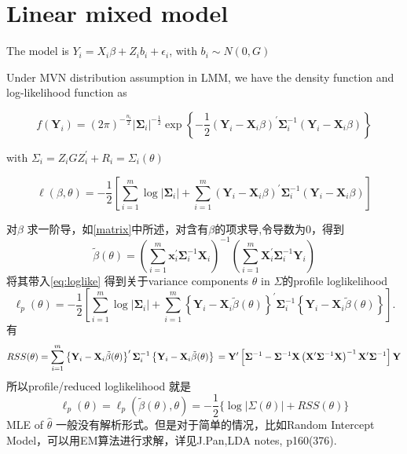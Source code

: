 \documentclass[
]{book}
\theoremstyle{definition}
\theoremstyle{definition}
\theoremstyle{definition}
\theoremstyle{remark}
\begin{document}
\hypertarget{linear-mixed-model}{%
\section{Linear mixed model}\label{linear-mixed-model}}

The model is \(Y_i=X_i\beta+Z_ib_i+\epsilon_i\), with \(b_i\sim N(0,G)\)

Under MVN distribution assumption in LMM, we have the density function and log-likelihood function as

\begin{equation}
f\left(\mathbf{Y}_{i}\right)=(2 \pi)^{-\frac{n_{i}}{2}}\left|\mathbf{\Sigma}_{i}\right|^{-\frac{1}{2}} \exp \left\{-\frac{1}{2}\left(\mathbf{Y}_{i}-\mathbf{X}_{i} \beta\right)^{\prime} \mathbf{\Sigma}_{i}^{-1}\left(\mathbf{Y}_{i}-\mathbf{X}_{i} \beta\right)\right\} 
 \label{eq:Normden}
\end{equation}

with \(\Sigma_{i}=Z_{i} G Z_{i}^{\prime}+R_{i}=\Sigma_{i}(\theta)\)

\begin{equation}
\ell(\beta, \theta)=-\frac{1}{2}\left[\sum_{i=1}^{m} \log \left|\mathbf{\Sigma}_{i}\right|+\sum_{i=1}^{m}\left(\mathbf{Y}_{i}-\mathbf{X}_{i} \beta\right)^{\prime} \mathbf{\Sigma}_{i}^{-1}\left(\mathbf{Y}_{i}-\mathbf{X}_{i} \beta\right)\right]
\label{eq:loglike}
\end{equation}

对\(\beta\) 求一阶导，如\ref{matrix}中所述，对含有\(\beta\)的项求导,令导数为0，得到
\[
\tilde{\beta}(\theta)=\left(\sum_{i=1}^{m} \mathbf{x}_{i}^{\prime} \mathbf{\Sigma}_{i}^{-1} \mathbf{X}_{i}\right)^{-1}\left(\sum_{i=1}^{m} \mathbf{X}_{i}^{\prime} \mathbf{\Sigma}_{i}^{-1} \mathbf{Y}_{i}\right)
\]
将其带入\eqref{eq:loglike} 得到关于variance components \(\theta\) in \(\Sigma\)的profile loglikelihood
\[
\ell_p(\theta)=-\frac{1}{2}\left[\sum_{i=1}^{m} \log \left|\mathbf{\Sigma}_{i}\right|+\sum_{i=1}^{m}\left\{\mathbf{Y}_{i}-\mathbf{X}_{i} \tilde{\beta}(\theta)\right\}^{\prime} \mathbf{\Sigma}_{i}^{-1}\left\{\mathbf{Y}_{i}-\mathbf{X}_{i} \tilde{\beta}(\theta)\right\}\right].
\]
有
\[
R S S(\theta)=\sum_{i=1}^{m}\left\{\mathbf{Y}_{i}-\mathbf{X}_{i} \tilde{\beta}(\theta)\right\}^{\prime} \mathbf{\Sigma}_{i}^{-1}\left\{\mathbf{Y}_{i}-\mathbf{X}_{i} \tilde{\beta}(\theta)\right\}\\
=\mathbf{Y}^{\prime}\left[\mathbf{\Sigma}^{-1}-\mathbf{\Sigma}^{-1} \mathbf{X}\left(\mathbf{X}^{\prime} \mathbf{\Sigma}^{-1} \mathbf{X}\right)^{-1} \mathbf{X}^{\prime} \mathbf{\Sigma}^{-1}\right] \mathbf{Y}
\]
所以profile/reduced loglikelihood 就是
\[
\ell_{p}(\theta)=\ell_{p}(\tilde{\beta}(\theta), \theta)=-\frac{1}{2}\{\log |\Sigma(\theta)|+R S S(\theta)\}
\]
MLE of \(\hat\theta\) 一般没有解析形式。但是对于简单的情况，比如Random Intercept Model，可以用EM算法进行求解，详见J.Pan,LDA notes, p160(376).
\end{document}
